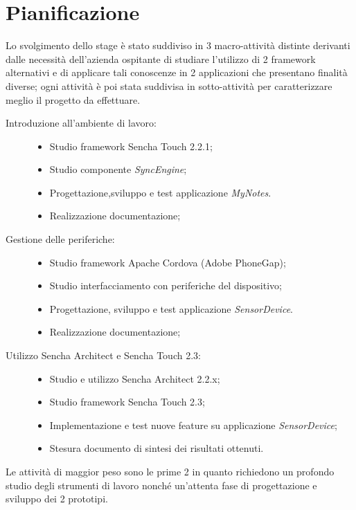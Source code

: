 \chapter{Pianificazione}\label{ch:pianificazione}
Lo svolgimento dello stage è stato suddiviso in 3 macro-attività distinte derivanti dalle necessità dell'azienda ospitante di studiare l'utilizzo di 2 framework alternativi e di applicare tali conoscenze in 2 applicazioni che presentano finalità diverse; ogni attività è poi stata suddivisa in sotto-attività per caratterizzare meglio il progetto da effettuare.
\begin{description}
\item[Introduzione all'ambiente di lavoro:] \hfill
	\begin{itemize}
	\item Studio framework Sencha Touch 2.2.1;
	\item Studio componente \emph{SyncEngine};
	\item Progettazione,sviluppo e test applicazione \emph{MyNotes}.
	\item Realizzazione documentazione;
	\end{itemize}
\item[Gestione delle periferiche:] \hfill
	\begin{itemize}
	\item Studio framework Apache Cordova (Adobe PhoneGap);
	\item Studio interfacciamento con periferiche del dispositivo;
	\item Progettazione, sviluppo e test applicazione \emph{SensorDevice}.
	\item Realizzazione documentazione;
	\end{itemize}
\item[Utilizzo Sencha Architect e Sencha Touch 2.3:] \hfill
	\begin{itemize}
	\item Studio e utilizzo Sencha Architect 2.2.x;
	\item Studio framework Sencha Touch 2.3;
	\item Implementazione e test nuove feature su applicazione \emph{SensorDevice};
	\item Stesura documento di sintesi dei risultati ottenuti.
	\end{itemize}
\end{description}
Le attività di maggior peso sono le prime 2 in quanto richiedono un profondo studio degli strumenti di lavoro nonché un'attenta fase di progettazione e sviluppo dei 2 prototipi.


